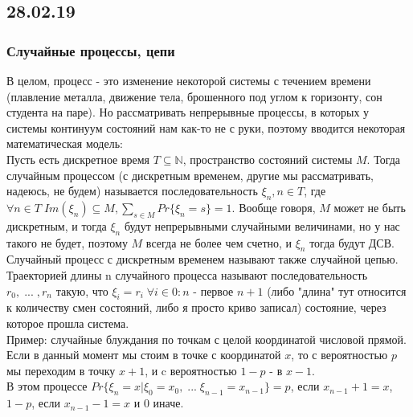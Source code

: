 \subsection{28.02.19}
\subsubsection{Случайные процессы, цепи}
В целом, процесс - это изменение некоторой системы с течением времени (плавление металла, движение тела, брошенного под углом к горизонту, сон студента на паре). Но рассматривать непрерывные процессы, в которых у системы континуум состояний нам как-то не с руки, поэтому вводится некоторая математическая модель:\\
Пусть есть дискретное время $T \subseteq \mathbb{N}$, пространство состояний системы $M$. Тогда случайным процессом (с дискретным временем, другие мы рассматривать, надеюсь, не будем) называется последовательность ${\xi_n, n \in T}$, где $\forall n \in T \; Im(\xi_n) \subseteq M, \sum\limits_{s \in M} Pr\{\xi_n = s\} = 1$. Вообще говоря, $M$ может не быть дискретным, и тогда $\xi_n$ будут непрерывными случайными величинами, но у нас такого не будет, поэтому $M$ всегда не более чем счетно, и $\xi_n$ тогда будут ДСВ. Случайный процесс с дискретным временем называют также случайной цепью.\\
Траекторией длины n случайного процесса называют последовательность $r_0, \; ... \; , r_n$ такую, что $\xi_i = r_i \; \forall i \in 0:n$ - первое $n + 1$ (либо "длина" тут относится к количеству смен состояний, либо я просто криво записал) состояние, через которое прошла система.\\
Пример: случайные блуждания по точкам с целой координатой числовой прямой. Если в данный момент мы стоим в точке с координатой $x$, то с вероятностью $p$ мы переходим в точку $x + 1$, и c вероятностью $1 - p$ - в $x - 1$.\\
В этом процессе $Pr\{\xi_n = x | \xi_0 = x_0, \; ... \; \xi_{n - 1} = x_{n - 1}\} =  p$, если $x_{n - 1} + 1 = x$, $1 - p$, если $x_{n - 1} - 1 = x$ и 0 иначе.
